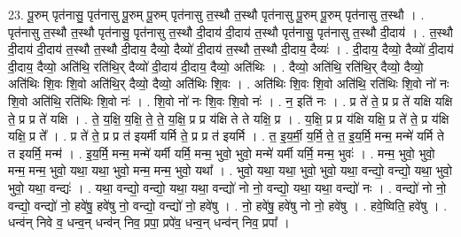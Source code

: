 \documentclass[17pt]{extarticle}
\begin{document}
23. पू॒रुम् पृत॑नासु॒ पृत॑नासु पू॒रुम् पू॒रुम् पृत॑नासु त॒स्थौ त॒स्थौ पृत॑नासु पू॒रुम् पू॒रुम् पृत॑नासु त॒स्थौ । . पृत॑नासु त॒स्थौ त॒स्थौ पृत॑नासु॒ पृत॑नासु त॒स्थौ दी॒दाय॑ दी॒दाय॑ त॒स्थौ पृत॑नासु॒ पृत॑नासु त॒स्थौ दी॒दाय॑ । . त॒स्थौ दी॒दाय॑ दी॒दाय॑ त॒स्थौ त॒स्थौ दी॒दाय॒ दैव्यो॒ दैव्यो॑ दी॒दाय॑ त॒स्थौ त॒स्थौ दी॒दाय॒ दैव्यः॑ । . दी॒दाय॒ दैव्यो॒ दैव्यो॑ दी॒दाय॑ दी॒दाय॒ दैव्यो॒ अति॑थि॒ रति॑थि॒र् दैव्यो॑ दी॒दाय॑ दी॒दाय॒ दैव्यो॒ अति॑थिः । . दैव्यो॒ अति॑थि॒ रति॑थि॒र् दैव्यो॒ दैव्यो॒ अति॑थिः शि॒वः शि॒वो अति॑थि॒र् दैव्यो॒ दैव्यो॒ अति॑थिः शि॒वः । . अति॑थिः शि॒वः शि॒वो अति॑थि॒ रति॑थिः शि॒वो नो॑ नः शि॒वो अति॑थि॒ रति॑थिः शि॒वो नः॑ । . शि॒वो नो॑ नः शि॒वः शि॒वो नः॑ । . न॒ इति॑ नः । . प्र ते॑ ते॒ प्र प्र ते॑ यक्षि यक्षि ते॒ प्र प्र ते॑ यक्षि । . ते॒ य॒क्षि॒ य॒क्षि॒ ते॒ ते॒ य॒क्षि॒ प्र प्र य॑क्षि ते ते यक्षि॒ प्र । . य॒क्षि॒ प्र प्र य॑क्षि यक्षि॒ प्र ते॑ ते॒ प्र य॑क्षि यक्षि॒ प्र ते᳚ । . प्र ते॑ ते॒ प्र प्र त॑ इयर्मी यर्मि ते॒ प्र प्र त॑ इयर्मि । . त॒ इ॒य॒र्मी॒ य॒र्मि॒ ते॒ त॒ इ॒य॒र्मि॒ मन्म॒ मन्मे॑ यर्मि ते त इयर्मि॒ मन्म॑ । . इ॒य॒र्मि॒ मन्म॒ मन्मे॑ यर्मी यर्मि॒ मन्म॒ भुवो॒ भुवो॒ मन्मे॑ यर्मी यर्मि॒ मन्म॒ भुवः॑ । . मन्म॒ भुवो॒ भुवो॒ मन्म॒ मन्म॒ भुवो॒ यथा॒ यथा॒ भुवो॒ मन्म॒ मन्म॒ भुवो॒ यथा᳚ । . भुवो॒ यथा॒ यथा॒ भुवो॒ भुवो॒ यथा॒ वन्द्यो॒ वन्द्यो॒ यथा॒ भुवो॒ भुवो॒ यथा॒ वन्द्यः॑ । . यथा॒ वन्द्यो॒ वन्द्यो॒ यथा॒ यथा॒ वन्द्यो॑ नो नो॒ वन्द्यो॒ यथा॒ यथा॒ वन्द्यो॑ नः । . वन्द्यो॑ नो नो॒ वन्द्यो॒ वन्द्यो॑ नो॒ हवे॑षु॒ हवे॑षु नो॒ वन्द्यो॒ वन्द्यो॑ नो॒ हवे॑षु । . नो॒ हवे॑षु॒ हवे॑षु नो नो॒ हवे॑षु । . हवे॒ष्विति॒ हवे॑षु । . धन्व॑न् निवे व॒ धन्व॒न् धन्व॑न् निव॒ प्रपा॒ प्रपे॑व॒ धन्व॒न् धन्व॑न् निव॒ प्रपा᳚ । \newline
\end{document}
